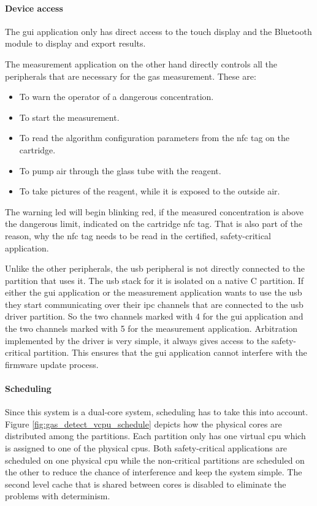 \paragraph{Device access}
The \acrshort{gui} application only has direct access to the touch display and the Bluetooth module to display and export results.

The measurement application on the other hand directly controls all the peripherals that are necessary for the gas measurement. These are:
\begin{itemize}
    \item {} To warn the operator of a dangerous concentration.
    \item {} To start the measurement.
    \item {} To read the algorithm configuration parameters from the \acrshort{nfc} tag on the cartridge.
    \item {} To pump air through the glass tube with the reagent.
    \item {} To take pictures of the reagent, while it is exposed to the outside air.
\end{itemize}
The warning \acrshort{led} will begin blinking red, if the measured concentration is above the dangerous limit, indicated on the cartridge \acrshort{nfc} tag. That is also part of the reason, why the \acrshort{nfc} tag needs to be read in the certified, safety-critical application.

Unlike the other peripherals, the \acrshort{usb} peripheral is not directly connected to the partition that uses it. The \acrshort{usb} stack for it is isolated on a native C partition. If either the \acrshort{gui} application or the measurement application wants to use the \acrshort{usb} they start communicating over their \acrshort{ipc} channels that are connected to the \acrshort{usb} driver partition. So the two channels marked with 4 for the \acrshort{gui} application and the two channels marked with 5 for the measurement application. Arbitration implemented by the driver is very simple, it always gives access to the safety-critical partition. This ensures that the \acrshort{gui} application cannot interfere with the firmware update process. 

\paragraph{Scheduling}
Since this system is a dual-core system, scheduling has to take this into account. Figure \ref{fig:gas_detect_vcpu_schedule} depicts how the physical cores are distributed among the partitions. Each partition only has one virtual \acrshort{cpu} which is assigned to one of the physical \acrshort{cpu}s. Both safety-critical applications are scheduled on one physical \acrshort{cpu} while the non-critical partitions are scheduled on the other to reduce the chance of interference and keep the system simple. The second level cache that is shared between cores is disabled to eliminate the problems with determinism. 


